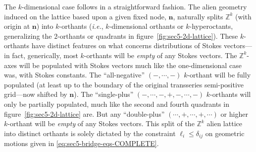 \documentclass[11pt,a4paper]{article}
\def\BZ{{\mathbb Z}}
\begin{document}
The $k$-dimensional case follows in a straightforward fashion. The alien geometry induced on the lattice based upon a given fixed node, $\boldsymbol{n}$, naturally splits $\BZ^k$ (with origin at $\boldsymbol{n}$) into $k$-orthants (\textit{i.e.}, $k$-dimensional orthants or $k$-hyperoctants, generalizing the $2$-orthants or quadrants in figure~\ref{fig:sec5-2d-lattice}). These $k$-orthants have distinct features on what concerns distributions of Stokes vectors---in fact, generically, most $k$-orthants will be \textit{empty} of any Stokes vectors. The $\BZ^k$-axes will be populated with Stokes vectors much like the one-dimensional case was, with Stokes constants. The ``all-negative'' $(-,\cdots,-)$ $k$-orthant will be fully populated (at least up to the boundary of the original transseries semi-positive grid---now shifted by $\boldsymbol{n}$). The ``single-plus'' $(-,\cdots,-,+,-,\cdots,-)$ $k$-orthants will only be partially populated, much like the second and fourth quadrants in figure~\ref{fig:sec5-2d-lattice} are. But any ``double-plus'' $(\cdots,+,\cdots,+,\cdots)$ or higher $k$-orthant will be \textit{empty} of any Stokes vectors. This split of the $\BZ^k$ alien lattice into distinct orthants is solely dictated by the constraint $\ell_i \leq \delta_{ij}$ on geometric motions given in \eqref{eq:sec5-bridge-eqs-COMPLETE}.
\end{document}
